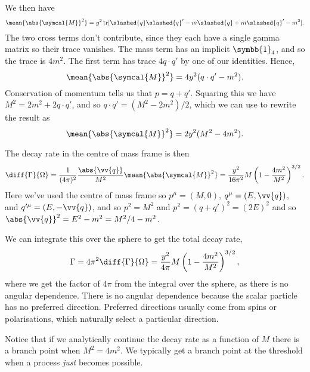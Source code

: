 \documentclass[fleqn]{NotesClass}
\newcommand{\ident}{\symbb{1}}
\newcommand{\amplitude}{\symcal{M}}
\DeclareMathOperator{\tr}{tr}
\begin{document}
    We then have
    \begin{equation}
        \mean{\abs{\amplitude}^2} = y^2 \tr[\slashed{q}\slashed{q}' - m\slashed{q} + m\slashed{q}' - m^2].
    \end{equation}
    The two cross terms don't contribute, since they each have a single gamma matrix so their trace vanishes.
    The mass term has an implicit \(\ident_4\), and so the trace is \(4m^2\).
    The first term has trace \(4 q \cdot q'\) by one of our identities.
    Hence,
    \begin{equation}
        \mean{\abs{\amplitude}^2} = 4y^2(q \cdot q' - m^2).
    \end{equation}
    Conservation of momentum tells us that \(p = q + q'\).
    Squaring this we have \(M^2 = 2m^2 + 2q \cdot q'\), and so \(q \cdot q' = (M^2 - 2m^2)/2\), which we can use to rewrite the result as
    \begin{equation}
        \mean{\abs{\amplitude}^2} = 2y^2(M^2 - 4m^2).
    \end{equation}
    
    The decay rate in the centre of mass frame is then
    \begin{equation}
        \diff{\Gamma}{\Omega} = \frac{1}{(4\pi)^2} \frac{\abs{\vv{q}}}{M^2} \mean{\abs{\amplitude}^2} = \frac{y^2}{16\pi^2} M\left( 1 - \frac{4m^2}{M^2} \right)^{3/2}.
    \end{equation}
    Here we've used the centre of mass frame so \(p^\mu = (M, 0)\), \(q^\mu = (E, \vv{q})\), and \(q'^\mu = (E, -\vv{q})\), and so \(p^2 = M^2\) and \(p^2 = (q + q')^2 = (2E)^2\) and so \(\abs{\vv{q}}^2 = E^2 - m^2 = M^2/4 - m^2\).
    
    We can integrate this over the sphere to get the total decay rate,
    \begin{equation}
        \Gamma = 4\pi^2 \diff{\Gamma}{\Omega} = \frac{y^2}{4\pi}M\left( 1 - \frac{4m^2}{M^2} \right)^{3/2},
    \end{equation}
    where we get the factor of \(4\pi\) from the integral over the sphere, as there is no angular dependence.
    There is no angular dependence because the scalar particle has no preferred direction.
    Preferred directions usually come from spins or polarisations, which naturally select a particular direction.
    
    Notice that if we analytically continue the decay rate as a function of \(M\) there is a branch point when \(M^2 = 4m^2\).
    We typically get a branch point at the threshold when a process \emph{just} becomes possible.
    
\end{document}
